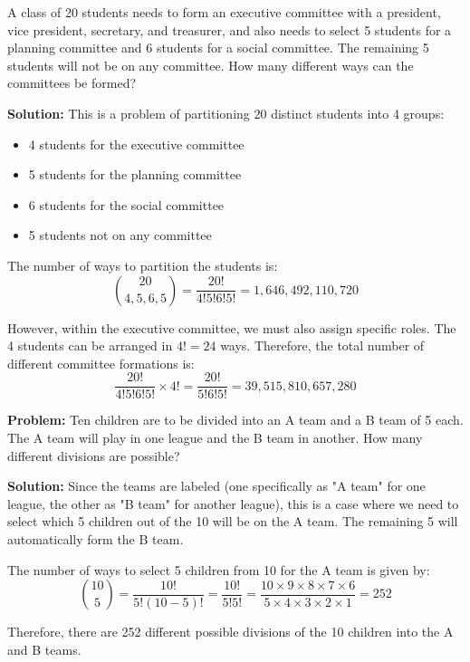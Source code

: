\begin{examplebox}[title=Example: Committee Formation]
    A class of 20 students needs to form an executive committee with a president, vice president, secretary, and treasurer, and also needs to select 5 students for a planning committee and 6 students for a social committee. The remaining 5 students will not be on any committee. How many different ways can the committees be formed?
    
    \textbf{Solution:} This is a problem of partitioning 20 distinct students into 4 groups:
    \begin{itemize}
        \item 4 students for the executive committee
        \item 5 students for the planning committee
        \item 6 students for the social committee
        \item 5 students not on any committee
    \end{itemize}
    
    The number of ways to partition the students is:
    \[
    \binom{20}{4, 5, 6, 5} = \frac{20!}{4!5!6!5!} = 1,646,492,110,720
    \]
    
    However, within the executive committee, we must also assign specific roles. The 4 students can be arranged in $4! = 24$ ways. Therefore, the total number of different committee formations is:
    \[
    \frac{20!}{4!5!6!5!} \times 4! = \frac{20!}{5!6!5!} = 39,515,810,657,280
    \]
\end{examplebox}

\begin{examplebox}[title=Example: Division of Teams into Different Leagues]
        \textbf{Problem:} Ten children are to be divided into an A team and a B team of 5 each. The A team will play in one league and the B team in another. How many different divisions are possible?
        
        \textbf{Solution:} Since the teams are labeled (one specifically as "A team" for one league, the other as "B team" for another league), this is a case where we need to select which 5 children out of the 10 will be on the A team. The remaining 5 will automatically form the B team.
        
        The number of ways to select 5 children from 10 for the A team is given by:
        \[
        \binom{10}{5} = \frac{10!}{5!(10-5)!} = \frac{10!}{5!5!} = \frac{10 \times 9 \times 8 \times 7 \times 6}{5 \times 4 \times 3 \times 2 \times 1} = 252
        \]
        
        Therefore, there are 252 different possible divisions of the 10 children into the A and B teams.
\end{examplebox}

